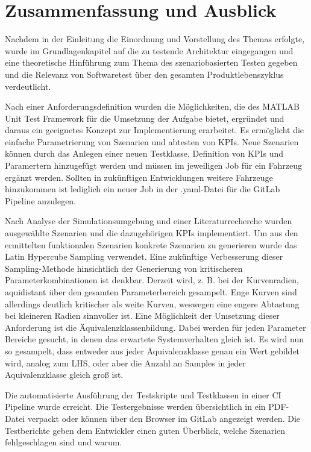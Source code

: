 \chapter{Zusammenfassung und Ausblick} \label{chap:Zusammenfassung}
\thispagestyle{empty}

Nachdem in der Einleitung die Einordnung und Vorstellung des Themas erfolgte, wurde im Grundlagenkapitel auf die zu testende Architektur eingegangen und eine theoretische Hinführung zum Thema des szenariobasierten Testen gegeben und die Relevanz von Softwaretest über den gesamten Produktlebenszyklus verdeutlicht.

Nach einer Anforderungsdefinition wurden die Möglichkeiten, die des MATLAB\textsuperscript{\textregistered} Unit Test Framework für die Umsetzung der Aufgabe bietet, ergründet und daraus ein geeignetes Konzept zur Implementierung erarbeitet. Es ermöglicht die einfache Parametrierung von Szenarien und abtesten von KPIs. Neue Szenarien können durch das Anlegen einer neuen Testklasse, Definition von KPIs und Paramertern hinzugefügt werden und müssen im jeweiligen Job für ein Fahrzeug ergänzt werden. Sollten in zukünftigen Entwicklungen weitere Fahrzeuge hinzukommen ist lediglich ein neuer Job in der .yaml-Datei für die GitLab Pipeline anzulegen. 

Nach Analyse der Simulationsumgebung und einer Literaturrecherche wurden ausgewählte Szenarien und die dazugehörigen KPIs implementiert. Um aus den ermittelten funktionalen Szenarien konkrete Szenarien zu generieren wurde das Latin Hypercube Sampling verwendet. Eine zukünftige Verbesserung dieser Sampling-Methode hinsichtlich der Generierung von kritischeren Parameterkombinationen ist denkbar. Derzeit wird, z. B. bei der Kurvenradien, aquidistant über den gesamten Parameterbereich gesampelt. Enge Kurven sind allerdings deutlich kritischer als weite Kurven, weswegen eine engere Abtastung bei kleineren Radien sinnvoller ist. Eine Möglichkeit der Umsetzung dieser Anforderung ist die Äquivalenzklassenbildung. Dabei werden für jeden Parameter Bereiche gesucht, in denen das erwartete Systemverhalten gleich ist. Es wird nun so gesampelt, dass entweder aus jeder Äquivalenzklasse genau ein Wert gebildet wird, analog zum LHS, oder aber die Anzahl an Samples in jeder Aquivalenzklasse gleich groß ist.

Die automatisierte Ausführung der Testskripte und Testklassen in einer CI Pipeline wurde erreicht. Die Testergebnisse werden übersichtlich in ein PDF-Datei verpackt oder können über den Browser im GitLab angezeigt werden. Die Testberichte geben dem Entwickler einen guten Überblick, welche Szenarien fehlgeschlagen sind und warum.